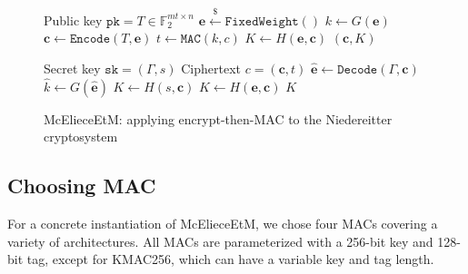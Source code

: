 \documentclass[runningheads]{llncs}
\newcommand{\encap}{\texttt{Encap}}
\newcommand{\decap}{\texttt{Decap}}
\newcommand{\mac}{\texttt{MAC}}
\newcommand{\pk}{\texttt{pk}}
\newcommand{\sk}{\texttt{sk}}
\newcommand{\leftsample}{\stackrel{\$}{\leftarrow}}
\begin{document}
\begin{figure}[h]
    \centering
    
    \begin{minipage}[t]{0.48\textwidth}
        \begin{algorithm}[H]
            \caption{$\encap_\text{McElieceEtM}(\pk)$}
            \begin{algorithmic}[1]
                \Require Public key $\pk = T \in\mathbb{F}_2^{mt \times n}$
                \State $\mathbf{e} \leftsample \texttt{FixedWeight}()$
                \State $k \leftarrow G(\mathbf{e})$
                \State $\mathbf{c} \leftarrow \texttt{Encode}(T, \mathbf{e})$
                \State $t \leftarrow \mac(k, c)$
                \State $K \leftarrow H(\mathbf{e}, \mathbf{c})$
                \State \Return $(\mathbf{c}, K)$
            \end{algorithmic}
        \end{algorithm}
    \end{minipage}\hfill
    \begin{minipage}[t]{0.48\textwidth}
        \begin{algorithm}[H]
            \caption{$\decap_\text{McElieceEtM}(\sk, c)$}
            \begin{algorithmic}[1]
                \Require Secret key $\sk = (\Gamma, s)$
                \Require Ciphertext $c = (\mathbf{c}, t)$
                \State $\hat{\mathbf{e}} \leftarrow \texttt{Decode}(\Gamma, \mathbf{c})$
                \State $\hat{k} \leftarrow G(\hat{\mathbf{e}})$
                \If{$\mac(\hat{k}, \mathbf{c}) \neq t$}
                    \State $K \leftarrow H(s, \mathbf{c})$
                \Else
                    \State $K \leftarrow H(\mathbf{e}, \mathbf{c})$
                \EndIf
                \State\Return $K$
            \end{algorithmic}
        \end{algorithm}
    \end{minipage}

    \caption{McElieceEtM: applying encrypt-then-MAC to the Niedereitter cryptosystem}\label{fig:mceliece-plus}
\end{figure}

\subsection{Choosing MAC}\label{sec:choosing-mac}
For a concrete instantiation of McElieceEtM, we chose four MACs covering a variety of architectures. All MACs are parameterized with a 256-bit key and 128-bit tag, except for KMAC256, which can have a variable key and tag length.
\end{document}
